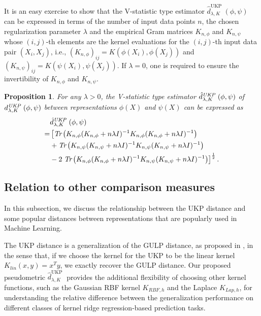 \documentclass{article}
\theoremstyle{plain}
\newcounter{propositionno}
\newtheorem{proposition}[propositionno]{Proposition}
\newcommand{\repone}{\phi}
\newcommand{\reptwo}{\psi}
\newcommand{\metricstname}{UKP }
\begin{document}
It is an easy exercise to show that the V-statistic type estimator $\hat{d}_{\lambda,K}^{\text{\metricstname}}(\repone,\reptwo)$ can be expressed in terms of the number of input data points $n$, the chosen regularization parameter $\lambda$ and the empirical Gram matrices $K_{n,\repone}$ and $K_{n,\reptwo}$ whose $(i,j)$-th elements are the kernel evaluations for the $(i,j)$-th input data pair $(X_{i},X_{j})$, i.e., $\left(K_{n,\repone}\right)_{ij} = K(\repone(X_{i}),\repone(X_{j}))$ and $\left(K_{n,\reptwo}\right)_{ij} = K(\reptwo(X_{i}),\reptwo(X_{j}))$. If $\lambda=0$, one is required to ensure the invertibility of $K_{n,\repone}$ and $K_{n,\reptwo}$.

\begin{proposition}\label{Proposition: Estimator in terms of Gram matrices}
    For any $\lambda>0$, the V-statistic type estimator $\hat{d}_{\lambda,K}^{\emph{\metricstname}}(\repone,\reptwo)$ of  $d_{\lambda,K}^{\emph{\metricstname}}(\repone,\reptwo)$ between representations $\repone(X)$ and $\reptwo(X)$ can be expressed as
    \[
    \begin{aligned}
        &\hat{d}_{\lambda,K}^{\emph{\metricstname}}(\repone,\reptwo)\\
        =& \left[\emph{Tr}\left(K_{n,\repone}(K_{n,\repone}+n\lambda I)^{-1}K_{n,\repone}(K_{n,\repone}+n\lambda I)^{-1}\right) \right.\\
        &+ \emph{Tr}\left(K_{n,\reptwo}(K_{n,\reptwo}+n\lambda I)^{-1}K_{n,\reptwo}(K_{n,\reptwo}+n\lambda I)^{-1}\right)\\
        &-2\left.\emph{Tr}\left(K_{n,\repone}(K_{n,\repone}+n\lambda I)^{-1}K_{n,\reptwo}(K_{n,\reptwo}+n\lambda I)^{-1}\right)\right]^{\frac{1}{2}}.
    \end{aligned}
    \]
\end{proposition}

\subsection{Relation to other comparison measures} 
\label{Relation to other comparison measures}

In this subsection, we discuss the relationship between the \metricstname distance and some popular distances between representations that are popularly used in Machine Learning.

The \metricstname distance is a generalization of the GULP distance, as proposed in \citet{GULP}, in the sense that, if we choose the kernel for the \metricstname to be the linear kernel $K_{lin}(x,y) = x^{T}y$, we exactly recover the GULP distance. Our proposed pseudometric $\hat{d}_{\lambda,K}^{\text{\metricstname}}$ provides the additional flexibility of choosing other kernel functions, such as the Gaussian RBF kernel $K_{RBF,h}$ and the Laplace $K_{Lap,h}$, for understanding the relative difference between the generalization performance on different classes of kernel ridge regression-based prediction tasks. 
\end{document}
